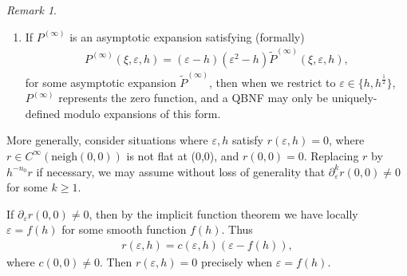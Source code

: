 \documentclass[12pt,lettersize]{article}
\renewcommand{\epsilon}{\varepsilon}
\theoremstyle{plain}%
\numberwithin{theorem}{section}
\numberwithin{equation}{section}
\theoremstyle{definition}
\theoremstyle{remark}
\newtheorem{remark}[theorem]{Remark}
\begin{document}
{\begin{remark}
\begin{enumerate}
\item If $P^{(\infty)}$ is an asymptotic expansion satisfying (formally)\begin{align}\label{rmultiple} P^{(\infty)}(\xi,\epsilon,h) = (\epsilon-h)(\epsilon^2-h)\tilde P^{(\infty)}(\xi,\epsilon,h), \end{align} for some asymptotic expansion  $\widetilde P^{(\infty)}$,  then when we restrict to $\epsilon\in \{h,h^\frac{1}{2}\}$,  $P^{(\infty)}$ represents the zero function, and a QBNF may only be uniquely-defined modulo expansions of this form.
\end{enumerate}

More generally, consider situations where $\epsilon,h$ satisfy $r(\epsilon,h) = 0$, where $r \in C^\infty(\mbox{neigh}(0,0))$ is not flat at (0,0), and $r(0,0) = 0$. Replacing $r$ by $h^{-n_0}r$ if necessary, we may assume without loss of generality that $\partial_\epsilon^k r(0,0)\neq 0$ for some $k \geq 1$.

If $\partial_\epsilon r(0,0) \neq 0$, then by the implicit function theorem we have locally $\epsilon = f(h)$ for some smooth function $f(h)$. Thus 
%
\begin{align*}
r(\epsilon,h) = c(\epsilon,h)(\epsilon-f(h)),
\end{align*}
%
where $c(0,0) \neq 0$. Then $r(\epsilon,h) = 0$ precisely when $\epsilon = f(h)$. 


\end{remark}}
\end{document}
